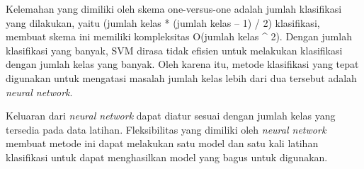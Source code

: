 Kelemahan yang dimiliki oleh skema one-versus-one adalah jumlah klasifikasi yang dilakukan, yaitu (jumlah kelas * (jumlah kelas – 1) / 2) klasifikasi, membuat skema ini memiliki kompleksitas O(jumlah kelas \^{} 2). Dengan jumlah klasifikasi yang banyak, SVM dirasa tidak efisien untuk melakukan klasifikasi dengan jumlah kelas yang banyak. Oleh karena itu, metode klasifikasi yang tepat digunakan untuk mengatasi masalah jumlah kelas lebih dari dua tersebut adalah \textit{neural network}.

Keluaran dari \textit{neural network} dapat diatur sesuai dengan jumlah kelas yang tersedia pada data latihan. Fleksibilitas yang dimiliki oleh \textit{neural network} membuat metode ini dapat melakukan satu model dan satu kali latihan klasifikasi untuk dapat menghasilkan model yang bagus untuk digunakan.